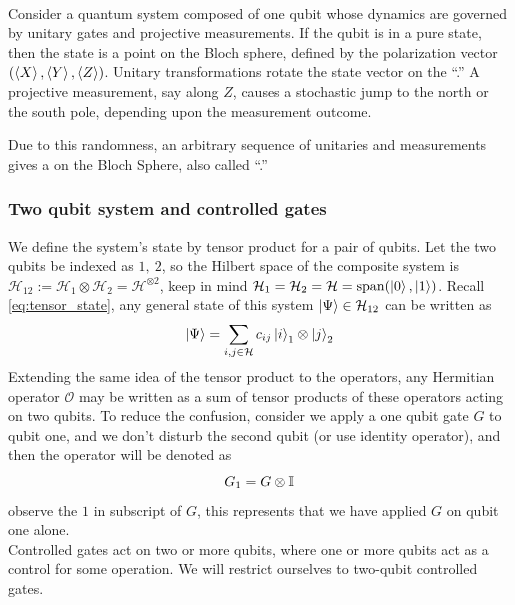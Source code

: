 \documentclass[11pt, oneside, listof=totoc]{scrbook}
\renewcommand{\H}{\mathcal{H}}
\renewcommand{\O}{\mathcal{O}}
\newcommand{\ku}{\ket{0}}
\newcommand{\kd}{\ket{1}}
\begin{document}
\\
Consider a quantum system composed of one qubit whose dynamics are governed by unitary gates and projective measurements. If the qubit is in a pure state, then the state is a point on the Bloch sphere, defined by the polarization vector $(\expval{X}, \expval{Y}, \expval{Z})$. Unitary transformations rotate the state vector on the ``.'' A projective measurement, say along \(Z\), causes a stochastic jump to the north or the south pole, depending upon the measurement outcome.

Due to this randomness, an arbitrary sequence of unitaries and measurements gives a  on the Bloch Sphere, also called ``.''

\subsubsection{Two qubit system and controlled gates}

We define the system's state by tensor product for a pair of qubits. Let the two qubits be indexed as \(1, ~2\), so the Hilbert space of the composite system is \(\H_{12} := \H_1 \otimes \H_2 = \H^{\otimes 2}\), keep in mind \(\H_1 = \H_2 = \H = \Span(\ku, \kd)\). Recall \cref{eq:tensor_state}, any general state of this system \(\ket{\Psi} \in \H_{12}\) can be written as
\[
    \ket{\Psi} = \sum_{i, j \in \H} c_{i j} \ket{i}_1 \otimes \ket{j}_2
\]
Extending the same idea of the tensor product to the operators, any Hermitian operator \(\O\) may be written as a sum of tensor products of these operators acting on two qubits. To reduce the confusion, consider we apply a one qubit gate \(G\) to qubit one, and we don't disturb the second qubit (or use identity operator), and then the operator will be denoted as
\[
    G_1 = G \otimes \mathbb{I}_{}
\]
observe the \(1\) in subscript of \(G\), this represents that we have applied \(G\) on qubit one alone.\\

 Controlled gates act on two or more qubits, where one or more qubits act as a control for some operation. We will restrict ourselves to two-qubit controlled gates.
\end{document}

